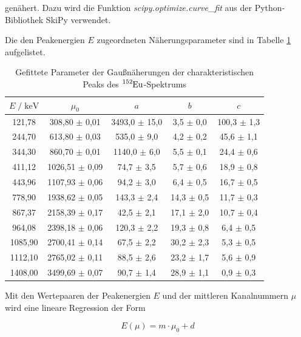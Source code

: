 genähert. Dazu wird die Funktion \textit{scipy.optimize.curve\_fit} aus der Python-Bibliothek SkiPy verwendet.

Die den Peakenergien $E$ zugeordneten Näherungsparameter sind in Tabelle \ref{tab:mess1} aufgelistet.

\begin{table}
  \centering
  \caption{Gefittete Parameter der Gaußnäherungen der charakteristischen Peaks des $\ce{^{152}Eu}$-Spektrums}
  \label{tab:mess1}
  \begin{tabular}{c c c c c}
  \toprule
  $ E \;/\; \si{\kilo\eV}$ & $\mu_0$ & $a$ & $b$ & $c$ \\
  \midrule
        121,78 &  308,80 $\pm$ 0,01 & 3493,0 $\pm$ 15,0 &  3,5 $\pm$ 0,0 & 100,3 $\pm$ 1,3 \\
        244,70 &  613,80 $\pm$ 0,03 &  535,0 $\pm$  9,0 &  4,2 $\pm$ 0,2 &  45,6 $\pm$ 1,1 \\
        344,30 &  860,70 $\pm$ 0,01 & 1140,0 $\pm$  6,0 &  5,5 $\pm$ 0,1 &  24,4 $\pm$ 0,6 \\
        411,12 & 1026,51 $\pm$ 0,09 &   74,7 $\pm$  3,5 &  5,7 $\pm$ 0,6 &  18,9 $\pm$ 0,8 \\
        443,96 & 1107,93 $\pm$ 0,06 &   94,2 $\pm$  3,0 &  6,4 $\pm$ 0,5 &  16,7 $\pm$ 0,5 \\
        778,90 & 1938,62 $\pm$ 0,05 &  143,3 $\pm$  2,4 & 14,3 $\pm$ 0,5 &  11,7 $\pm$ 0,3 \\
        867,37 & 2158,39 $\pm$ 0,17 &   42,5 $\pm$  2,1 & 17,1 $\pm$ 2,0 &  10,7 $\pm$ 0,4 \\
        964,08 & 2398,18 $\pm$ 0,06 &  120,3 $\pm$  2,2 & 19,3 $\pm$ 0,8 &   6,4 $\pm$ 0,5 \\
       1085,90 & 2700,41 $\pm$ 0,14 &   67,5 $\pm$  2,2 & 30,2 $\pm$ 2,3 &   5,3 $\pm$ 0,5 \\
       1112,10 & 2765,02 $\pm$ 0,11 &   88,5 $\pm$  2,6 & 23,2 $\pm$ 1,7 &   5,6 $\pm$ 0,9 \\
       1408,00 & 3499,69 $\pm$ 0,07 &   90,7 $\pm$  1,4 & 28,9 $\pm$ 1,1 &   0,9 $\pm$ 0,3 \\
  \bottomrule
  \end{tabular}
  \end{table}

Mit den Wertepaaren der Peakenergien $E$ und der mittleren Kanalnummern $\mu$ wird eine lineare Regression der Form

\begin{equation}
  E(\mu) = m \cdot \mu_0 + d
  \label{eqn:eich}
\end{equation}
  

